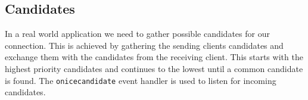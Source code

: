 \subsection{ Candidates}
In a real world application we need to gather possible  candidates for our connection. This is achieved by gathering the sending clients  candidates and exchange them with the  candidates from the receiving client. This starts with the highest priority candidates and continues to the lowest until a common candidate is found. The \lstinline[basicstyle=\ttfamily\color{black}]|onicecandidate| event handler is used to listen for incoming  candidates.